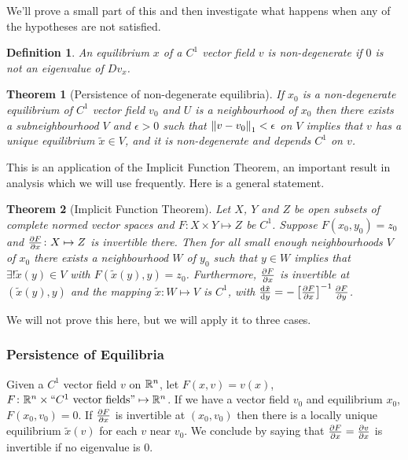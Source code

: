 \documentclass{notes}
\theoremstyle{plain}
\newtheorem*{theorem}{Theorem}
\newtheorem*{definition}{Definition}
\begin{document}
We'll prove a small part of this and then investigate what happens
when any of the hypotheses are not satisfied.

\begin{definition}
An equilibrium $x$ of a $C^1$ vector field $v$ is non-degenerate if $0$ is
not an eigenvalue of $Dv_x$.
\end{definition}

\begin{theorem}[Persistence of non-degenerate equilibria]
If $x_0$ is a non-degenerate equilibrium of $C^1$ vector field $v_0$
and $U$ is a neighbourhood of $x_0$ then there exists a subneighbourhood
$V$ and $\epsilon > 0$ such that $\left\|v-v_0\right\|_1 < \epsilon$ on $V$
implies that $v$ has a unique equilibrium $\tilde{x} \in V$, and it is
non-degenerate and depends $C^1$ on $v$.
\end{theorem}

This is an application of the Implicit Function Theorem, an important
result in analysis which we will use frequently.  Here is a general statement.

\begin{theorem}[Implicit Function Theorem]
Let $X$, $Y$ and $Z$ be open subsets of complete normed vector spaces
and $F \colon X \times Y \mapsto Z$ be $C^1$.  Suppose $F(x_0,y_0) = z_0$
and $\frac{\partial F}{\partial x} \colon X \mapsto Z$ is invertible there.  Then for all
small enough neighbourhoods $V$ of $x_0$ there exists a neighbourhood
$W$ of $y_0$ such that $y \in W$ implies that $\exists! \tilde{x}(y) \in V$
with $F(\tilde{x}(y),y) = z_0$.  Furthermore, $\frac{\partial F}{\partial x}$ is invertible
at $(\tilde{x}(y),y)$ and the mapping $\tilde{x} \colon W \mapsto V$
is $C^1$, with $\frac{\mathrm{d}\tilde{x}}{\mathrm{d} y} = - \left[
\frac{\partial F}{\partial x} \right]^{-1} \frac{\partial F}{\partial y}$.
\end{theorem}

We will not prove this here, but we will apply it to three cases.

\subsubsection*{Persistence of Equilibria}
Given a $C^1$ vector field $v$ on $\mathbb{R}^n$, let $F(x,v) = v(x)$,
$F \colon \mathbb{R}^n \times \text{``$C^1$ vector fields''} \mapsto \mathbb{R}^n$.
If we have a vector field $v_0$ and equilibrium $x_0$, $F(x_0,v_0)=0$.  If
$\frac{\partial F}{\partial x}$ is invertible at $(x_0,v_0)$ then there is a locally unique
equilibrium $\tilde{x}(v)$ for each $v$ near $v_0$.  We conclude by
saying that $\frac{\partial F}{\partial x}=\frac{\partial v}{\partial x}$ is invertible if no eigenvalue is $0$.
\end{document}
